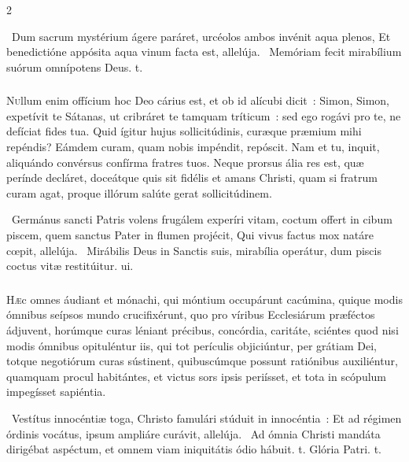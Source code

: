 \documentclass[9pt,twoside]{extarticle}
\begin{document}
\begin{multicols}{2}
\begin{tightlist}{}
\item {}~Dum sacrum mystérium ágere paráret, urcéolos ambos invénit aqua plenos, \textred{*} Et benedictióne appósita aqua vinum facta est, allelúja. ~Memóriam fecit mirabílium suórum omnípotens Deus. t.
\end{tightlist}

\subsubsection*{\center {}}
\lettrine{N}ullum enim offícium hoc Deo cárius est, et ob id alícubi dicit~: Simon, Simon, expetívit te Sátanas, ut cribráret te tamquam tríticum~: sed ego rogávi pro te, ne defíciat fides tua. Quid ígitur hujus sollicitúdinis, curæque præmium mihi repéndis? Eámdem curam, quam nobis impéndit, repóscit. Nam et tu, inquit, aliquándo convérsus confírma fratres tuos. Neque prorsus ália res est, quæ perínde decláret, doceátque quis sit fidélis et amans Christi, quam si fratrum curam agat, proque illórum salúte gerat sollicitúdinem.

\begin{tightlist}{}
\item {}~Germánus sancti Patris volens frugálem experíri vitam, coctum offert in cibum piscem, quem sanctus Pater in flumen projécit, \textred{*} Qui vivus factus mox natáre cœpit, allelúja. ~Mirábilis Deus in Sanctis suis, mirabília operátur, dum piscis coctus vitæ restitúitur. ui.
\end{tightlist}

\subsubsection*{\center {}}
\lettrine{H}æc omnes áudiant et mónachi, qui móntium occupárunt cacúmina, quique modis ómnibus seípsos mundo crucifixérunt, quo pro víribus Ecclesiárum præféctos ádjuvent, horúmque curas léniant précibus, concórdia, caritáte, sciéntes quod nisi modis ómnibus opituléntur iis, qui tot perículis objiciúntur, per grátiam Dei, totque negotiórum curas sústinent, quibuscúmque possunt ratiónibus auxiliéntur, quamquam procul habitántes, et victus sors ipsis periísset, et tota in scópulum impegísset sapiéntia.

\begin{tightlist}{}
\item {}~Vestítus innocéntiæ toga, Christo famulári stúduit in innocéntia~: \textred{*} Et ad régimen órdinis vocátus, ipsum ampliáre curávit, allelúja. ~Ad ómnia Christi mandáta dirigébat aspéctum, et omnem viam iniquitátis ódio hábuit. t. Glória Patri. t.
\end{tightlist}


\end{multicols}
\end{document}
